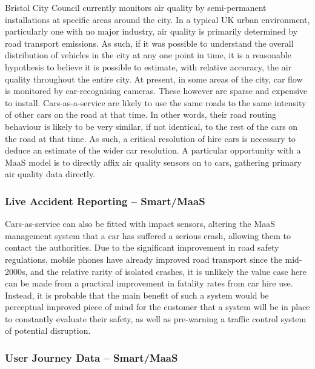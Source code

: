 \documentclass[journal]{IEEEtran}
\begin{document}
Bristol City Council currently monitors air quality by semi-permanent
installations at specific areas around the city. In a typical UK urban
environment, particularly one with no major industry, air quality is
primarily determined by road transport emissions. As such, if it was
possible to understand the overall distribution of vehicles in the
city at any one point in time, it is a reasonable hypothesis to
believe it is possible to estimate, with relative accuracy, the air
quality throughout the entire city. At present, in some areas of the
city, car flow is monitored by car-recognising cameras. These however
are sparse and expensive to install. Cars-as-a-service are likely to
use the same roads to the same intensity of other cars on the road at
that time. In other words, their road routing behaviour is likely to be
very similar, if not identical, to the rest of the cars on the road at
that time. As such, a critical resolution of hire cars is necessary to
deduce an estimate of the wider car resolution. A particular
opportunity with a MaaS model is to directly affix air quality sensors
on to cars, gathering primary air quality data directly.



\subsubsection{Live Accident Reporting -- Smart/MaaS}

Cars-as-service can also be fitted with impact sensors, altering the
MaaS management system that a car has suffered a serious crash,
allowing them to contact the authorities. Due to the significant
improvement in road safety regulations, mobile phones have already
improved road transport since the mid-2000s, and the relative rarity
of isolated crashes, it is unlikely the value case here can be made
from a practical improvement in fatality rates from car hire
use. Instead, it is probable that the main benefit of such a system
would be perceptual improved piece of mind for the customer that a
system will be in place to constantly evaluate their safety, as well
as pre-warning a traffic control system of potential disruption.


\subsubsection{User Journey Data – Smart/MaaS}
\end{document}
